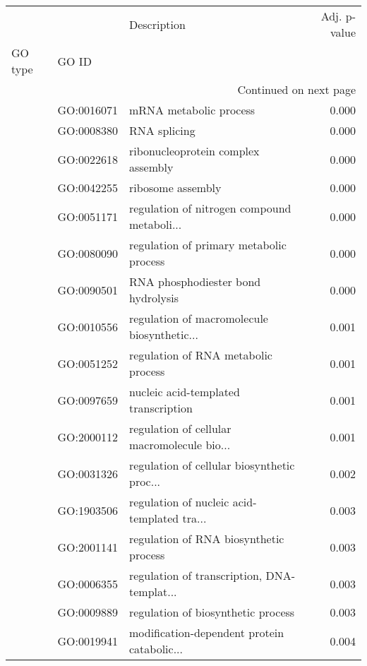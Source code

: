 \begin{longtable}{lllr}
\toprule
   &            &                                  Description &  Adj. p-value \\
GO type & GO ID &                                              &               \\
\midrule
\endhead
\midrule
\multicolumn{4}{r}{{Continued on next page}} \\
\midrule
\endfoot

\bottomrule
\endlastfoot
\multirow{51}{*}{BP} & GO:0016071 &                       mRNA metabolic process &         0.000 \\
   & GO:0008380 &                                 RNA splicing &         0.000 \\
   & GO:0022618 &           ribonucleoprotein complex assembly &         0.000 \\
   & GO:0042255 &                            ribosome assembly &         0.000 \\
   & GO:0051171 &  regulation of nitrogen compound metaboli... &         0.000 \\
   & GO:0080090 &      regulation of primary metabolic process &         0.000 \\
   & GO:0090501 &           RNA phosphodiester bond hydrolysis &         0.000 \\
   & GO:0010556 &  regulation of macromolecule biosynthetic... &         0.001 \\
   & GO:0051252 &          regulation of RNA metabolic process &         0.001 \\
   & GO:0097659 &         nucleic acid-templated transcription &         0.001 \\
   & GO:2000112 &  regulation of cellular macromolecule bio... &         0.001 \\
   & GO:0031326 &  regulation of cellular biosynthetic proc... &         0.002 \\
   & GO:1903506 &  regulation of nucleic acid-templated tra... &         0.003 \\
   & GO:2001141 &       regulation of RNA biosynthetic process &         0.003 \\
   & GO:0006355 &  regulation of transcription, DNA-templat... &         0.003 \\
   & GO:0009889 &           regulation of biosynthetic process &         0.003 \\
   & GO:0019941 &  modification-dependent protein catabolic... &         0.004 \\

\end{longtable}
